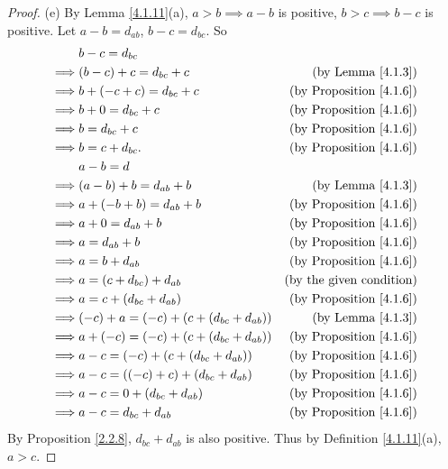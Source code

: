\begin{proof}{(e)}
    By Lemma \ref{4.1.11}(a), \(a > b \implies a - b\) is positive, \(b > c \implies b - c\) is positive.
    Let \(a - b = d_{ab}\), \(b - c = d_{bc}\).
    So
    \begin{align*}
                 & b - c = d_{bc}                                                                  \\
        \implies & (b - c) + c = d_{bc} + c                  & \text{(by Lemma \ref{4.1.3})}       \\
        \implies & b + (-c + c) = d_{bc} + c                 & \text{(by Proposition \ref{4.1.6})} \\
        \implies & b + 0 = d_{bc} + c                        & \text{(by Proposition \ref{4.1.6})} \\
        \implies & b = d_{bc} + c                            & \text{(by Proposition \ref{4.1.6})} \\
        \implies & b = c + d_{bc}.                           & \text{(by Proposition \ref{4.1.6})} \\
                 & a - b = d                                                                       \\
        \implies & (a - b) + b = d_{ab} + b                  & \text{(by Lemma \ref{4.1.3})}       \\
        \implies & a + (-b + b) = d_{ab} + b                 & \text{(by Proposition \ref{4.1.6})} \\
        \implies & a + 0 = d_{ab} + b                        & \text{(by Proposition \ref{4.1.6})} \\
        \implies & a = d_{ab} + b                            & \text{(by Proposition \ref{4.1.6})} \\
        \implies & a = b + d_{ab}                            & \text{(by Proposition \ref{4.1.6})} \\
        \implies & a = (c + d_{bc}) + d_{ab}                 & \text{(by the given condition)}     \\
        \implies & a = c + (d_{bc} + d_{ab})                 & \text{(by Proposition \ref{4.1.6})} \\
        \implies & (-c) + a = (-c) + (c + (d_{bc} + d_{ab})) & \text{(by Lemma \ref{4.1.3})}       \\
        \implies & a + (-c) = (-c) + (c + (d_{bc} + d_{ab})) & \text{(by Proposition \ref{4.1.6})} \\
        \implies & a - c = (-c) + (c + (d_{bc} + d_{ab}))    & \text{(by Proposition \ref{4.1.6})} \\
        \implies & a - c = ((-c) + c) + (d_{bc} + d_{ab})    & \text{(by Proposition \ref{4.1.6})} \\
        \implies & a - c = 0 + (d_{bc} + d_{ab})             & \text{(by Proposition \ref{4.1.6})} \\
        \implies & a - c = d_{bc} + d_{ab}                   & \text{(by Proposition \ref{4.1.6})} \\
    \end{align*}
    By Proposition \ref{2.2.8}, \(d_{bc} + d_{ab}\) is also positive.
    Thus by Definition \ref{4.1.11}(a), \(a > c\).
\end{proof}

